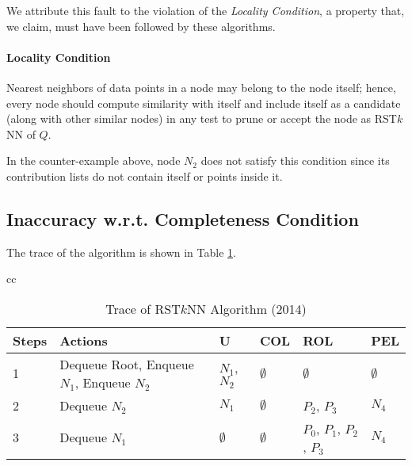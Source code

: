 \documentclass[prodmode,letterpaper]{acmsmall}
\newcommand{\rstknn}{RST$k$NN\xspace}
\begin{document}
We attribute this fault to the violation of the {\em Locality
Condition}, a property that, we claim, must have been followed by these
algorithms.

\paragraph{Locality Condition} Nearest neighbors of data points in a node may belong to
the node itself; hence, every node
should compute similarity with itself and include itself as a candidate (along
with other similar nodes) in any test to prune or accept the node as \rstknn of $Q$.

In the counter-example above, node $N_2$ does not satisfy this condition
since its contribution lists do not contain itself or points inside it.

\subsection{Inaccuracy w.r.t. Completeness Condition}\label{subsec:completeness}
The trace of the algorithm \cite{lu2014efficient} is shown in Table \ref{Tab:rstknn_algo_2014}.
\begin{table}[!htb]
	\begin{tabular}{cc}\noindent\begin{minipage}[t]{\linewidth}
			\begin{center}
				\caption{Trace of \rstknn Algorithm (2014) \label{Tab:rstknn_algo_2014}}
				\begin{tabular}{|l | p{4cm} | l | l | l | l |}
					\hline
					\bfseries{Steps} & \bfseries{Actions} & \bfseries{U}& \textbf{COL} & \textbf{ROL} & \textbf{PEL} \\
					\hline
					1 & Dequeue Root, Enqueue $N_1$, Enqueue $N_2$ & $N_1$, $N_2$ &$\emptyset$& $\emptyset$ & $\emptyset$\\ 
					\hline
					2 & Dequeue $N_2$ & $N_1$ & $\emptyset$ & $P_2$, $P_3$ & $N_4$\\
					\hline
					3 & Dequeue $N_1$ & $\emptyset$ & $\emptyset$ & $P_0$, $P_1$, $P_2$, $P_3$ & $N_4$\\
					\hline
				\end{tabular}
			\end{center}
\end{minipage}
	\end{tabular}
\end{table} 
\end{document}
